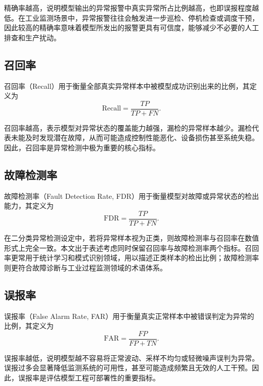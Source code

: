 \documentclass[bachelor, vlined]{DissertUESTC}
\begin{document}
    精确率越高，说明模型输出的异常报警中真实异常所占比例越高，也即误报程度越低。在工业监测场景中，异常报警往往会触发进一步巡检、停机检查或调度干预，因此较高的精确率意味着模型所发出的报警更具有可信度，能够减少不必要的人工排查和生产扰动。
    
    \subsection{召回率}
    
    召回率（Recall）用于衡量全部真实异常样本中被模型成功识别出来的比例，其定义为
    \begin{equation}
        \mathrm{Recall}
        =
        \frac{TP}{TP + FN}.
    \end{equation}
    
    召回率越高，表示模型对异常状态的覆盖能力越强，漏检的异常样本越少。漏检代表未能及时发现潜在故障，从而可能造成控制性能恶化、设备损伤甚至系统失稳。因此，召回率是异常检测中极为重要的核心指标。
    
    \subsection{故障检测率}
    
    故障检测率（Fault Detection Rate, FDR）用于衡量模型对故障或异常状态的检出能力，其定义为
    \begin{equation}
        \mathrm{FDR}
        =
        \frac{TP}{TP + FN}.
    \end{equation}
    
    在二分类异常检测设定中，若将异常样本视为正类，则故障检测率与召回率在数值形式上完全一致。本文出于表述考虑同时保留召回率与故障检测率两个指标。召回率更常用于统计学习和模式识别领域，用以描述正类样本的检出比例；故障检测率则更符合故障诊断与工业过程监测领域的术语体系。
    
    \subsection{误报率}
    
    误报率（False Alarm Rate, FAR）用于衡量真实正常样本中被错误判定为异常的比例，其定义为
    \begin{equation}
        \mathrm{FAR}
        =
        \frac{FP}{FP + TN}.
    \end{equation}
    
    误报率越低，说明模型越不容易将正常波动、采样不均匀或轻微噪声误判为异常。误报过多会显著降低监测系统的可用性，甚至可能造成频繁且无效的人工干预。因此，误报率是评估模型工程可部署性的重要指标。
    
\end{document}
